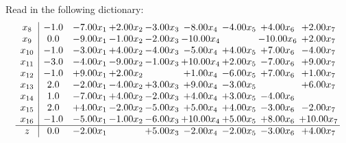 \documentclass[9pt]{article}
\begin{document}
Read in the following dictionary:
\[\begin{array}{c| c c@{\hskip 2pt} c@{\hskip 2pt} c@{\hskip 2pt} c@{\hskip 2pt} c@{\hskip 2pt} c@{\hskip 2pt} c@{\hskip 2pt} }
 x_{8}   &  -1.0 & -7.00 x_{1} & +  2.00 x_{2} & -3.00 x_{3} & -8.00 x_{4} & -4.00 x_{5} & +  4.00 x_{6} & +  2.00 x_{7}\\
 x_{9}   &  0.0 & -9.00 x_{1} & -1.00 x_{2} & -2.00 x_{3} & -10.00 x_{4} &   & -10.00 x_{6} & +  2.00 x_{7}\\
 x_{10}   &  -1.0 & -3.00 x_{1} & +  4.00 x_{2} & -4.00 x_{3} & -5.00 x_{4} & +  4.00 x_{5} & +  7.00 x_{6} & -4.00 x_{7}\\
 x_{11}   &  -3.0 & -4.00 x_{1} & -9.00 x_{2} & -1.00 x_{3} & + 10.00 x_{4} & +  2.00 x_{5} & -7.00 x_{6} & +  9.00 x_{7}\\
 x_{12}   &  -1.0 & +  9.00 x_{1} & +  2.00 x_{2} &   & +  1.00 x_{4} & -6.00 x_{5} & +  7.00 x_{6} & +  1.00 x_{7}\\
 x_{13}   &  2.0 & -2.00 x_{1} & -4.00 x_{2} & +  3.00 x_{3} & +  9.00 x_{4} & -3.00 x_{5} &   & +  6.00 x_{7}\\
 x_{14}   &  1.0 & -7.00 x_{1} & +  4.00 x_{2} & -2.00 x_{3} & +  4.00 x_{4} & +  3.00 x_{5} & -4.00 x_{6} &   \\
 x_{15}   &  2.0 & +  4.00 x_{1} & -2.00 x_{2} & -5.00 x_{3} & +  5.00 x_{4} & +  4.00 x_{5} & -3.00 x_{6} & -2.00 x_{7}\\
 x_{16}   &  -1.0 & -5.00 x_{1} & -1.00 x_{2} & -6.00 x_{3} & + 10.00 x_{4} & +  5.00 x_{5} & +  8.00 x_{6} & + 10.00 x_{7}\\
\hline
z    &  0.0 & -2.00 x_{1} &   & +  5.00 x_{3} & -2.00 x_{4} & -2.00 x_{5} & -3.00 x_{6} & +  4.00 x_{7}\\
\end{array}\]
\end{document}
